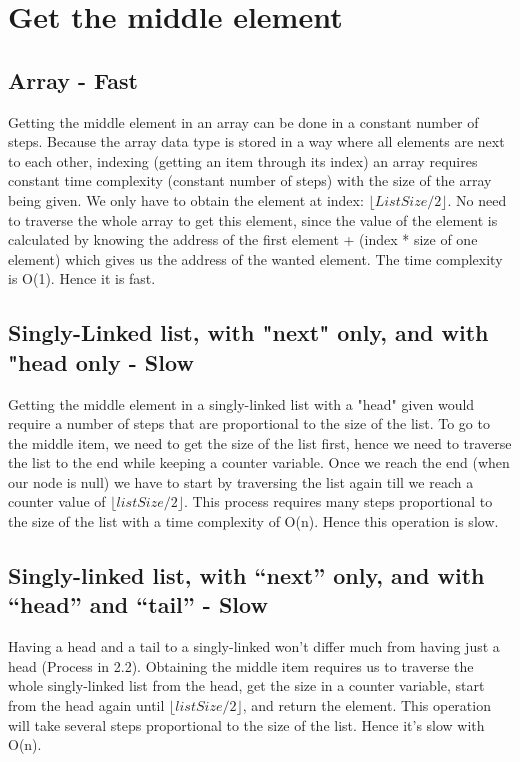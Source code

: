 \documentclass{article}
\begin{document}

\section{Get the middle element}
\subsection{Array - Fast}
Getting the middle element in an array can be done in a constant number of steps. Because the array data type is stored in a way where all elements are next to each other, indexing (getting an item through its index) an array requires constant time complexity (constant number of steps) with the size of the array being given. We only have to obtain the element at index: $\lfloor {ListSize/2} \rfloor$. No need to traverse the whole array to get this element, since the value of the element is calculated by knowing the address of the first element + (index * size of one element) which gives us the address of the wanted element. The time complexity is O(1). Hence it is fast.

\subsection{Singly-Linked list, with "next" only, and with "head only - Slow}
Getting the middle element in a singly-linked list with a "head" given would require a number of steps that are proportional to the size of the list. To go to the middle item, we need to get the size of the list first, hence we need to traverse the list to the end while keeping a counter variable. Once we reach the end (when our node is null) we have to start by traversing the list again till we reach a counter value of $\lfloor {listSize/2} \rfloor$. This process requires many steps proportional to the size of the list with a time complexity of O(n). Hence this operation is slow.

\subsection{Singly-linked list, with “next” only, and with “head” and “tail” - Slow}
Having a head and a tail to a singly-linked won't differ much from having just a head (Process in 2.2). Obtaining the middle item requires us to traverse the whole singly-linked list from the head, get the size in a counter variable, start from the head again until $\lfloor {listSize/2} \rfloor$, and return the element. This operation will take several steps proportional to the size of the list. Hence it's slow with O(n).
\end{document}
